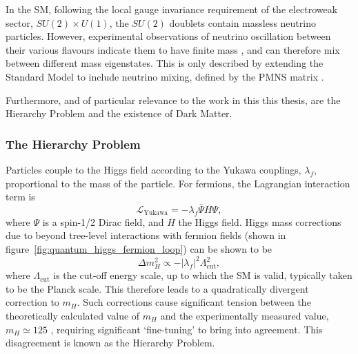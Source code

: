 In the SM, following the local gauge invariance requirement of the electroweak
sector, $SU(2)\times U(1)$, the $SU(2)$ doublets contain
massless neutrino particles. However, experimental observations of neutrino
oscillation between their various flavours indicate them to have finite mass
\cite{PhysRevLett.81.1562,PhysRevLett.89.011302}, and can
therefore mix between different mass eigenstates. This is only described
by extending the Standard Model to include neutrino mixing, defined by the
PMNS matrix \cite{Altarelli:2002hx}.

Furthermore, and of particular relevance to the work in this this thesis, are
the Hierarchy Problem and the existence of Dark Matter.

\subsubsection{The Hierarchy Problem}


Particles couple to the Higgs field according to the Yukawa couplings,
$\lambda_f$,
proportional to the mass of the particle. For fermions, the Lagrangian
interaction term is
% 
\begin{equation}
\mathcal{L}_\text{Yukawa} = - \lambda_f \bar{\Psi}H\Psi,
\end{equation}
% 
where $\Psi$ is a spin-1/2 Dirac field, and $H$ the Higgs field. Higgs mass
corrections due to beyond tree-level interactions with fermion
fields (shown in figure~\ref{fig:quantum_higgs_fermion_loop}) can be shown to be
% 
\begin{equation}
\Delta m_H^2 \propto -|\lambda_f|^2 \Lambda_{\text{cut}}^2,
\label{eq:higgs_corr_hierarchy}
\end{equation}
% 
where $\Lambda_{\text{cut}}$ is the cut-off energy scale, up to which the SM is
valid, typically taken to be the Planck scale. This therefore leads to a
quadratically
divergent correction to $m_H$. Such corrections cause significant tension
between the theoretically calculated value of $m_H$ and the experimentally
measured value, $m_H \simeq 125$ \gev \cite{Chatrchyan:2012ufa, Aad:2012tfa},
requiring significant `fine-tuning' to bring into agreement. This disagreement
is known as the Hierarchy Problem.

